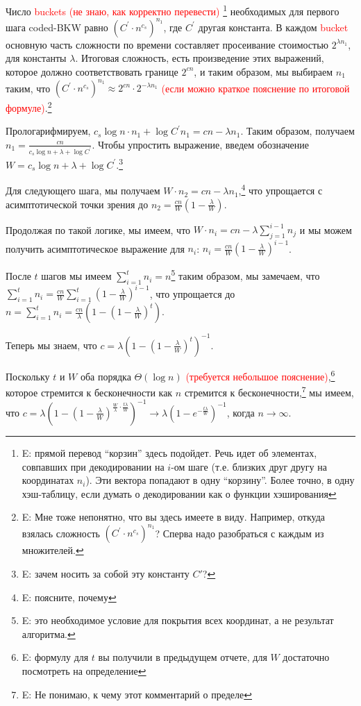 \documentclass[a4paper,11pt]{article}
\begin{document}
Число \textcolor{red}{buckets (не знаю, как корректно перевести)} \footnote{E: прямой перевод ``корзин'' здесь подойдет. Речь идет об элементах, совпавших при декодировании на $i$-ом шаге (т.е. близких друг другу на координатах $n_i$). Эти вектора попадают в одну ``корзину''. Более точно, в одну хэш-таблицу, если думать о декодировании как о функции хэширования} необходимых для первого шага coded-BKW равно $(C^{'} \cdot n^{c_s})^{n_1}$, где $C^{'}$ другая константа. В каждом \textcolor{red}{bucket} основную часть сложности по времени составляет просеивание стоимостью $2^{\lambda n_1}$, для константы $\lambda$. Итоговая сложность, есть произведение этих выражений, которое должно соответствовать границе $2^{cn}$, и таким образом, мы выбираем $n_1$ таким, что $(C^{'} \cdot n^{c_s})^{n_1} \approx 2^{cn} \cdot 2^{- \lambda n_1}$ \textcolor{red}{(если можно краткое пояснение по итоговой формуле)}.\footnote{E: Мне тоже непонятно, что вы здесь имеете в виду. Например, откуда взялась сложность $(C^{'} \cdot n^{c_s})^{n_1}$? Сперва надо разобраться с каждым из множителей.}

Прологарифмируем, $c_s \log{n} \cdot n_1 + \log{C^{'}} n_1 = cn - \lambda n_1$. Таким образом, получаем $n_1 = \frac{cn}{c_s \log{n} + \lambda + \log{C^{'}}}$. Чтобы упростить выражение, введем обозначение $W=c_s \log{n} + \lambda + \log{C^{'}}$.\footnote{E: зачем носить за собой эту константу $C'$?}

Для следующего шага, мы получаем $W \cdot n_2 = cn - \lambda n_1$,\footnote{E: поясните, почему} что упрощается с асимптотической точки зрения до $n_2 = \frac{cn}{W} (1 - \frac{\lambda}{W})$.

Продолжая по такой логике, мы имеем, что $W \cdot n_i = cn - \lambda \sum_{j=1}^{i-1}  n_j$ и мы можем получить асимптотическое выражение для $n_i$: $n_i = \frac{cn}{W} (1 - \frac{\lambda}{W})^{i-1}$.

После $t$ шагов мы имеем $\sum_{i=1}^t n_i = n$\footnote{E: это необходимое условие для покрытия всех координат, а не результат алгоритма.} таким образом, мы замечаем, что $\sum_{i=1}^t n_i = \frac{cn}{W} \sum_{i=1}^t (1 - \frac{\lambda}{W})^{i-1}$, что упрощается до $n = \sum_{i=1}^t n_i = \frac{cn}{\lambda} (1-(1-\frac{\lambda}{W})^t)$.

Теперь мы знаем, что $c=\lambda (1-(1-\frac{\lambda}{W})^t)^{-1}$.

Поскольку $t$ и $W$ оба порядка $\Theta(\log{n})$  \textcolor{red}{(требуется небольшое пояснение)},\footnote{E: формулу для $t$ вы получили в предыдущем отчете, для $W$ достаточно посмотреть на определение } которое стремится к бесконечности как $n$ стремится к бесконечности,\footnote{E: Не понимаю, к чему этот комментарий о пределе} мы имеем, что $c=\lambda (1-(1-\frac{\lambda}{W})^{\frac{W}{\lambda} \cdot \frac{t \lambda}{W}})^{-1} \rightarrow \lambda (1-e^{- \frac{t \lambda}{W}})^{-1}$, когда $n \rightarrow \infty$.
\end{document}
